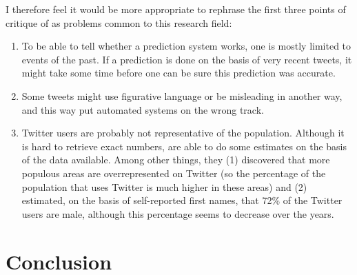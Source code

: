 \documentclass[12pt]{article}
\begin{document}
I therefore feel it would be more appropriate to rephrase the first three points of critique of  as problems common to this research field:

\begin{enumerate}
\item To be able to tell whether a prediction system works, one is mostly limited to events of the past. If a prediction is done on the basis of very recent tweets, it might take some time before one can be sure this prediction was accurate.
\item Some tweets might use figurative language or be misleading in another way, and this way put automated systems on the wrong track.
\item Twitter users are probably not representative of the population. Although it is hard to retrieve exact numbers,  are able to do some estimates on the basis of the data available. Among other things, they (1) discovered that more populous areas are overrepresented on Twitter (so the percentage of the population that uses Twitter is much higher in these areas) and (2) estimated, on the basis of self-reported first names, that 72\% of the Twitter users are male, although this percentage seems to decrease over the years.
\end{enumerate}


\section{Conclusion} \label{conclusion}

{}

\end{document}
